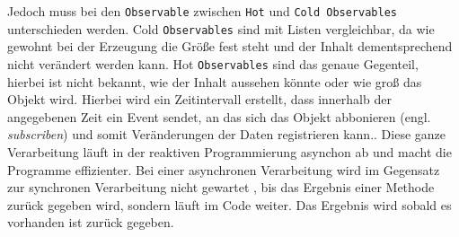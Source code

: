 Jedoch muss bei den \texttt{Observable} zwischen \texttt{Hot} und  \texttt{Cold Observables} unterschieden werden.
Cold \texttt{Observables} sind mit Listen vergleichbar, da wie gewohnt bei der Erzeugung die Gr\"o\ss{}e fest steht und der Inhalt dementsprechend nicht ver\"andert werden kann.
Hot \texttt{Observables} sind das genaue Gegenteil, hierbei ist nicht bekannt, wie der Inhalt aussehen k\"onnte oder wie gro\ss{} das Objekt wird. Hierbei wird ein Zeitintervall erstellt, dass innerhalb der angegebenen Zeit ein Event sendet, an das sich das Objekt abbonieren (engl. \textit{subscriben}) und somit Ver\"anderungen der Daten registrieren kann.\cite{Lohmuller2016}. Diese ganze Verarbeitung l\"auft in der reaktiven Programmierung asynchon ab und macht die Programme effizienter. Bei einer asynchronen Verarbeitung wird im Gegensatz zur synchronen Verarbeitung nicht gewartet , bis das Ergebnis einer Methode zur\"uck gegeben wird, sondern l\"auft im Code weiter. Das Ergebnis wird sobald es vorhanden ist zur\"uck gegeben.

